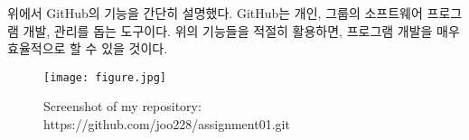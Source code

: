 \documentclass[a4paper, 11pt]{article}
\begin{document}
위에서 GitHub의 기능을 간단히 설명했다. GitHub는 개인, 그룹의 소프트웨어 프로그램 개발, 관리를 돕는 도구이다. 위의 기능들을 적절히 활용하면, 프로그램 개발을 매우 효율적으로 할 수 있을 것이다.

\newpage
\begin{figure} 

\begin{center} 

\caption{Screenshot of my repository: https://github.com/joo228/assignment01.git} 

\texttt{[image: figure.jpg]} 

\end{center} 

\end{figure} 
\end{document}
